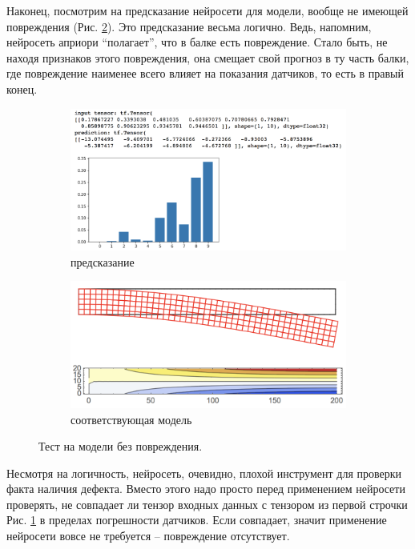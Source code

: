\documentclass[a4paper,12pt]{article}
\theoremstyle{remark}
\begin{document}
	Наконец, посмотрим на предсказание нейросети для модели, вообще не имеющей повреждения (Рис. \ref{fig:nn1_no_damage}). Это предсказание весьма логично. Ведь, напомним, нейросеть априори ``полагает'', что в балке есть повреждение. Стало быть, не находя признаков этого повреждения, она смещает свой прогноз в ту часть балки, где повреждение наименее всего влияет на показания датчиков, то есть в правый конец.
	\begin{figure}[h]
		\begin{subfigure}[t]{0.6\textwidth}
			\includegraphics[width=\linewidth]{nn1_no_damage.png}
			\caption{предсказание}
			\label{fig:nn1_no_damage_a}
		\end{subfigure}
		\begin{subfigure}[t]{0.4\textwidth}
			\includegraphics[width=\linewidth]{ds1_no_damage.png}
			\caption{соответствующая модель}
		\end{subfigure}
		\caption{Тест на модели без повреждения.}
		\label{fig:nn1_no_damage}
	\end{figure}

	Несмотря на логичность, нейросеть, очевидно, плохой инструмент для проверки факта наличия дефекта. Вместо этого надо просто перед применением нейросети проверять, не совпадает ли тензор входных данных с тензором из первой строчки Рис. \ref{fig:nn1_no_damage_a} в пределах погрешности датчиков. Если совпадает, значит применение нейросети вовсе не требуется -- повреждение отсутствует.
	
\end{document}
